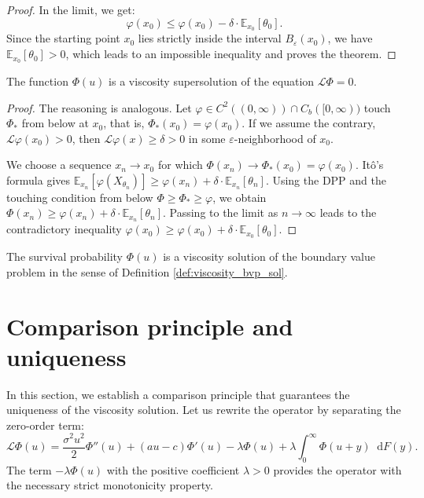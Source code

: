 \documentclass[smallextended]{svjour3}
\providecommand{\diff}{\mathop{}\!\mathrm{d}}
\begin{document}
\begin{proof}
In the limit, we get:
$$ \varphi(x_0) \le \varphi(x_0) - \delta \cdot \mathbb{E}_{x_0}[\theta_0]. $$
Since the starting point $x_0$ lies strictly inside the interval $B_\varepsilon(x_0)$, we have $\mathbb{E}_{x_0}[\theta_0] > 0$, which leads to an impossible inequality and proves the theorem.
\end{proof}

\begin{theorem}
The function $\Phi(u)$ is a viscosity supersolution of the equation $\mathcal{L} \Phi = 0$.
\end{theorem}

\begin{proof}
The reasoning is analogous. Let $\varphi \in C^2((0, \infty)) \cap C_b([0, \infty))$ touch $\Phi_*$ from below at $x_0$, that is, $\Phi_*(x_0) = \varphi(x_0)$. If we assume the contrary, $\mathcal{L}\varphi(x_0) > 0$, then $\mathcal{L}\varphi(x) \ge \delta > 0$ in some $\varepsilon$-neighborhood of $x_0$. 

We choose a sequence $x_n \to x_0$ for which $\Phi(x_n) \to \Phi_*(x_0) = \varphi(x_0)$. It\^{o}'s formula gives $\mathbb{E}_{x_n}[\varphi(X_{\theta_n})] \ge \varphi(x_n) + \delta \cdot \mathbb{E}_{x_n}[\theta_n]$. Using the DPP and the touching condition from below $\Phi \ge \Phi_* \ge \varphi$, we obtain $\Phi(x_n) \ge \varphi(x_n) + \delta \cdot \mathbb{E}_{x_n}[\theta_n]$. Passing to the limit as $n \to \infty$ leads to the contradictory inequality $\varphi(x_0) \ge \varphi(x_0) + \delta \cdot \mathbb{E}_{x_0}[\theta_0]$.
\end{proof}

\begin{corollary}
\label{cor:visc_existence}
The survival probability $\Phi(u)$ is a viscosity solution of the boundary value problem in the sense of Definition \ref{def:viscosity_bvp_sol}.
\end{corollary}

\section{Comparison principle and uniqueness}
\label{sec:comparison}

In this section, we establish a comparison principle that guarantees the uniqueness of the viscosity solution. Let us rewrite the operator by separating the zero-order term:
\begin{equation*}
\mathcal{L}\Phi(u) = \frac{\sigma^2 u^2}{2} \Phi''(u) + (a u - c)\Phi'(u) - \lambda \Phi(u) + \lambda \int_0^\infty \Phi(u+y) \diff F(y).
\end{equation*}
The term $-\lambda \Phi(u)$ with the positive coefficient $\lambda > 0$ provides the operator with the necessary strict monotonicity property.
\end{document}

